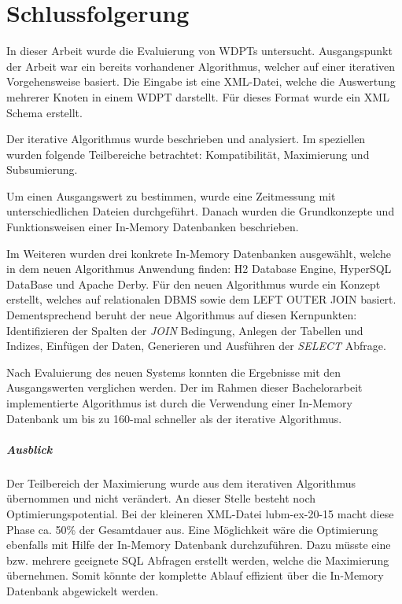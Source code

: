 \documentclass[draft,final]{vutinfth} %
\begin{document}
\chapter{Schlussfolgerung}


In dieser Arbeit wurde die Evaluierung von WDPTs untersucht. Ausgangspunkt der Arbeit war ein bereits vorhandener Algorithmus, welcher auf einer iterativen Vorgehensweise basiert.
Die Eingabe ist eine XML-Datei, welche die Auswertung mehrerer Knoten in einem WDPT darstellt. Für dieses Format wurde ein XML Schema erstellt.

Der iterative Algorithmus wurde beschrieben und analysiert. Im speziellen wurden folgende Teilbereiche betrachtet: Kompatibilität, Maximierung und Subsumierung.

Um einen Ausgangswert zu bestimmen, wurde eine Zeitmessung mit unterschiedlichen Dateien durchgeführt. 
Danach wurden die Grundkonzepte und Funktionsweisen einer In-Memory Datenbanken beschrieben. 

Im Weiteren wurden drei konkrete In-Memory Datenbanken ausgewählt, welche in dem neuen Algorithmus Anwendung finden: H2 Database Engine, HyperSQL DataBase und Apache Derby.
Für den neuen Algorithmus wurde ein Konzept erstellt, welches auf relationalen DBMS sowie dem LEFT OUTER JOIN basiert. 
Dementsprechend beruht der neue Algorithmus auf diesen Kernpunkten: Identifizieren der Spalten der \textit{JOIN} Bedingung, Anlegen der Tabellen und Indizes, Einfügen der Daten, Generieren und Ausführen der \textit{SELECT} Abfrage.

Nach Evaluierung des neuen Systems konnten die Ergebnisse mit den Ausgangswerten verglichen werden. Der im Rahmen dieser Bachelorarbeit implementierte Algorithmus ist durch die Verwendung einer In-Memory Datenbank um bis zu 160-mal schneller als der iterative Algorithmus.
   
\paragraph{Ausblick} Der Teilbereich der Maximierung wurde aus dem iterativen Algorithmus übernommen und nicht verändert. An dieser Stelle besteht noch Optimierungspotential. Bei der kleineren XML-Datei lubm-ex-20-15 macht diese Phase ca. 50\% der Gesamtdauer aus. Eine Möglichkeit wäre die Optimierung ebenfalls mit Hilfe der In-Memory Datenbank durchzuführen. Dazu müsste eine bzw. mehrere geeignete SQL Abfragen erstellt werden, welche die Maximierung übernehmen. Somit könnte der komplette Ablauf effizient über die In-Memory Datenbank abgewickelt werden.
\end{document}
